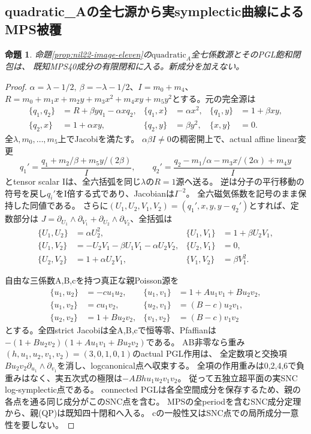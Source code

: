 \documentclass[a4paper,11pt]{ltjsarticle}
\newtheorem{proposition}{命題}[section]
\theoremstyle{definition}
\begin{document}
\subsection{quadratic\_Aの全七源から実symplectic曲線によるMPS被覆}
\begin{proposition}\label{prop:nil22-quadraticA-MPS}
命題\ref{prop:nil22-image-eleven}の$\mathrm{quadratic}_A$全七係数源とそのPGL飽和閉包は、
既知MPS40成分の有限閉和に入る。新成分を加えない。
\end{proposition}
\begin{proof}
$\alpha=\lambda-1/2,\ \beta=-\lambda-1/2$、$I=m_0+m_4$、
$R=m_0+m_1x+m_2y+m_3x^2+m_4xy+m_5y^2$とする。元の完全源は
\[
\begin{aligned}
 \{q_1,q_2\}&=R+\beta yq_1-\alpha xq_2,&
 \{q_1,x\}&=\alpha x^2,&\{q_1,y\}&=1+\beta xy,\\
 \{q_2,x\}&=1+\alpha xy,&\{q_2,y\}&=\beta y^2,&\{x,y\}&=0.
\end{aligned}
\]
全$\lambda,m_0,\ldots,m_5$上でJacobiを満たす。
$\alpha\beta I\ne0$の稠密開上で、actual affine linear変更
\[
 q_1'=\frac{q_1+m_2/\beta+m_5y/(2\beta)}I,\qquad
 q_2'=\frac{q_2-m_1/\alpha-m_3x/(2\alpha)+m_4y}I
\]
とtensor scalar Iは、全六括弧を同じ$\lambda$の$R=1$源へ送る。
逆は分子の平行移動の符号を戻し$q_i'$をI倍する式であり、Jacobianは$I^{-2}$。
全六磁気係数を記号のまま保持した同値である。
さらに$(U_1,U_2,V_1,V_2)=(q_1',x,y,y-q_2')$とすれば、定数部分は
$J=\partial_{U_1}\wedge\partial_{V_1}+\partial_{U_2}\wedge\partial_{V_2}$、全括弧は
\[
\begin{aligned}
 \{U_1,U_2\}&=\alpha U_2^2,&\{U_1,V_1\}&=1+\beta U_2V_1,\\
 \{U_1,V_2\}&=-U_2V_1-\beta U_1V_1-\alpha U_2V_2,&\{U_2,V_1\}&=0,\\
 \{U_2,V_2\}&=1+\alpha U_2V_1,&\{V_1,V_2\}&=\beta V_1^2.
\end{aligned}                                                    \tag{QA}
\]

自由な三係数A,B,cを持つ真正な親Poisson源を
\[
\begin{aligned}
 \{u_1,u_2\}&=-cu_1u_2,&\{u_1,v_1\}&=1+Au_1v_1+Bu_2v_2,\\
 \{u_1,v_2\}&=cu_1v_2,&\{u_2,v_1\}&=(B-c)u_2v_1,\\
 \{u_2,v_2\}&=1+Bu_2v_2,&\{v_1,v_2\}&=(B-c)v_1v_2
\end{aligned}                                                    \tag{QP}
\]
とする。全四strict Jacobiは全A,B,cで恒等零、Pfaffianは
$-(1+Bu_2v_2)(1+Au_1v_1+Bu_2v_2)$である。
AB非零なら重み$(h,u_1,u_2,v_1,v_2)=(3,0,1,0,1)$のactual PGL作用は、
全定数項と交換項$Bu_2v_2\partial_{u_1}\wedge\partial_{v_1}$を消し、logcanonical点へ収束する。
全項の作用重みは0,2,4,6で負重みはなく、実五次式の極限は$-ABhu_1u_2v_1v_2$。
従って五独立超平面の実SNC log-symplectic点である。
connected PGLは各全空間成分を保存するため、親の各点を通る同じ成分がこのSNC点を含む。
MPSの全periodを含むSNC成分定理から、親(QP)は既知四十閉和へ入る。
cの一般性又はSNC点での局所成分一意性を要しない。


\end{proof}
\end{document}
